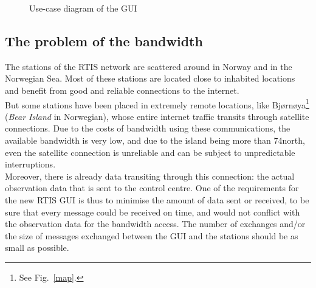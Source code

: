 \documentclass{themeensg}
\begin{document}
\begin{figure}[ht]
	\begin{center}
	\end{center}
	\caption{Use-case diagram of the GUI}
\end{figure}

\subsection{The problem of the bandwidth}

The stations of the RTIS network are scattered around in Norway and in the Norwegian Sea. Most of these stations are located close to inhabited locations and benefit from good and reliable connections to the internet.\\

But some stations have been placed in extremely remote locations, like Bjørnøya\footnote{See Fig.~\ref{map}.} (\textit{Bear Island} in Norwegian), whose entire internet traffic transits through satellite connections. Due to the costs of bandwidth using these communications, the available bandwidth is very low, and due to the island being more than 74\degre north, even the satellite connection is unreliable and can be subject to unpredictable interruptions. \\

Moreover, there is already data transiting through this connection: the actual observation data that is sent to the control centre. One of the requirements for the new RTIS GUI is thus to minimise the amount of data sent or received, to be sure that every message could be received on time, and would not conflict with the observation data for the bandwidth access. The number of exchanges and/or the size of messages exchanged between the GUI and the stations should be as small as possible.\\
\end{document}
